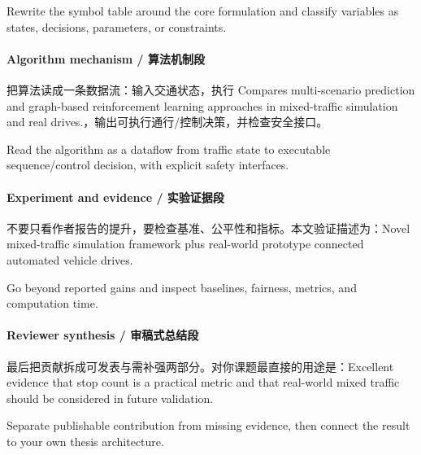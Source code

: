 \documentclass[UTF8,a4paper,11pt,fontset=fandol]{ctexart}
\begin{document}
Rewrite the symbol table around the core formulation and classify variables as states, decisions, parameters, or constraints.

\paragraph{Algorithm mechanism / 算法机制段}把算法读成一条数据流：输入交通状态，执行 Compares multi-scenario prediction and graph-based reinforcement learning approaches in mixed-traffic simulation and real drives.，输出可执行通行/控制决策，并检查安全接口。

Read the algorithm as a dataflow from traffic state to executable sequence/control decision, with explicit safety interfaces.

\paragraph{Experiment and evidence / 实验证据段}不要只看作者报告的提升，要检查基准、公平性和指标。本文验证描述为：Novel mixed-traffic simulation framework plus real-world prototype connected automated vehicle drives.

Go beyond reported gains and inspect baselines, fairness, metrics, and computation time.

\paragraph{Reviewer synthesis / 审稿式总结段}最后把贡献拆成可发表与需补强两部分。对你课题最直接的用途是：Excellent evidence that stop count is a practical metric and that real-world mixed traffic should be considered in future validation.

Separate publishable contribution from missing evidence, then connect the result to your own thesis architecture.
\end{document}
